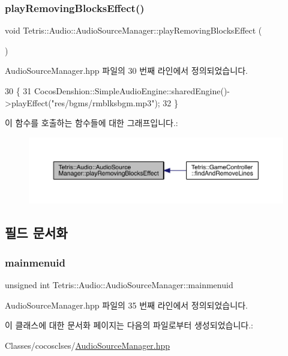 \subsubsection{\texorpdfstring{play\+Removing\+Blocks\+Effect()}{playRemovingBlocksEffect()}}
{\footnotesize\ttfamily void Tetris\+::\+Audio\+::\+Audio\+Source\+Manager\+::play\+Removing\+Blocks\+Effect (\begin{DoxyParamCaption}{ }\end{DoxyParamCaption})\hspace{0.3cm}{\ttfamily [inline]}}



Audio\+Source\+Manager.\+hpp 파일의 30 번째 라인에서 정의되었습니다.


\begin{DoxyCode}
30                                        \{
31             CocosDenshion::SimpleAudioEngine::sharedEngine()->playEffect(\textcolor{stringliteral}{"res/bgms/rmblksbgm.mp3"});
32         \}
\end{DoxyCode}
이 함수를 호출하는 함수들에 대한 그래프입니다.\+:
\nopagebreak
\begin{figure}[H]
\begin{center}
\leavevmode
\includegraphics[width=350pt]{d2/d6a/class_tetris_1_1_audio_1_1_audio_source_manager_a44c761f0200291a2c8f282d8d52aa081_icgraph}
\end{center}
\end{figure}


\subsection{필드 문서화}
\mbox{\label{class_tetris_1_1_audio_1_1_audio_source_manager_a6baf8cdd348f47e49ae2337eb9548fa0}} 
\subsubsection{\texorpdfstring{mainmenuid}{mainmenuid}}
{\footnotesize\ttfamily unsigned int Tetris\+::\+Audio\+::\+Audio\+Source\+Manager\+::mainmenuid\hspace{0.3cm}{\ttfamily [private]}}



Audio\+Source\+Manager.\+hpp 파일의 35 번째 라인에서 정의되었습니다.



이 클래스에 대한 문서화 페이지는 다음의 파일로부터 생성되었습니다.\+:\begin{DoxyCompactItemize}
\item 
Classes/cocosclses/\hyperlink{_audio_source_manager_8hpp}{Audio\+Source\+Manager.\+hpp}\end{DoxyCompactItemize}
